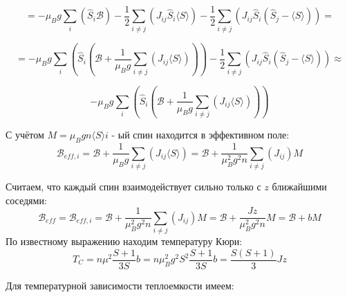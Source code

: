 \documentclass[a4paper,12pt]{article} %
\begin{document}
\begin{ttask}
\[ =-\mu_{B} g \sum_{i}\left(\hat{S}_{i} \mathcal{B}\right)-\frac{1}{2} \sum_{i \neq j}\left(J_{i j} \hat{S}_{i}\langle S\rangle\right)-\frac{1}{2} \sum_{i \neq j}\left(J_{i j} \hat{S}_{i}\left(\hat{S}_{j}-\langle S\rangle\right)\right)= \]





$$
=-\mu_{B} g \sum_{i}\left(\hat{S}_{i}\left(\mathcal{B}+\frac{1}{\mu_{B} g} \sum_{i \neq j}\left(J_{i j}\langle S\rangle\right)\right)\right)-\frac{1}{2} \sum_{i \neq j}\left(J_{i j} \hat{S}_{i}\left(\hat{S}_{j}-\langle S\rangle\right)\right)  \approx
$$



$$
-\mu_{B} g \sum_{i}\left(\hat{S}_{i}\left(\mathcal{B}+\frac{1}{\mu_{B} g} \sum_{i \neq j}\left(J_{i j}\langle S\rangle\right)\right)\right)
$$


С учётом $M=\mu_{B} g n\langle S\rangle i$ - ый спин находится в эффективном поле:
$$
\mathcal{B}_{e f f, i}=\mathcal{B}+\frac{1}{\mu_{B} g} \sum_{i \neq j}\left(J_{i j}\langle S\rangle\right)=\mathcal{B}+\frac{1}{\mu_{B}^{2} g^{2} n} \sum_{i \neq j}\left(J_{i j}\right) M
$$








Считаем, что каждый спин взаимодействует сильно только с $z$ ближайшими соседями:
$$
\mathcal{B}_{e f f}=\mathcal{B}_{e f f, i}=\mathcal{B}+\frac{1}{\mu_{B}^{2} g^{2} n} \sum_{i \neq j}\left(J_{i j}\right) M=\mathcal{B}+\frac{J z}{\mu_{B}^{2} g^{2} n} M=\mathcal{B}+b M
$$
По известному выражению находим температуру Кюри:
$$
T_{C}=n \mu^{2} \frac{S+1}{3 S} b=n \mu_{B}^{2} g^{2} S^{2} \frac{S+1}{3 S} b=\frac{S(S+1)}{3} J z
$$






Для температурной зависимости теплоемкости имеем:































\end{ttask}
\end{document}
